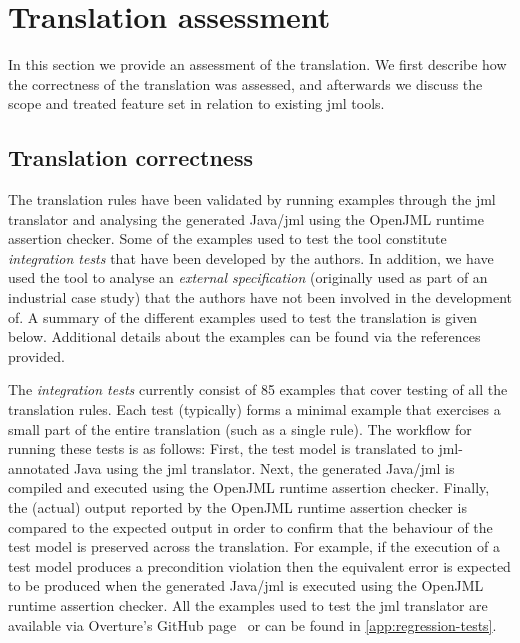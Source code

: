 
\section{Translation assessment}
\label{sec:assess}

In this section we provide an assessment of the translation. We first
describe how the correctness of the translation was assessed, and
afterwards we discuss the scope and treated feature set in relation to
existing \ac{jml} tools.

\subsection{Translation correctness}

The translation rules have been validated by running examples through
the \ac{jml} translator and analysing the generated Java/\ac{jml}
using the OpenJML runtime assertion checker. Some of the examples used
to test the tool constitute \emph{integration tests} that have been
developed by the authors. In addition, we have used the tool to
analyse an \emph{external specification} (originally used as part of
an industrial case study) that the authors have not been involved in
the development of. A summary of the different examples used to test
the translation is given below. Additional details about the examples
can be found via the references provided.

The \emph{integration tests} currently consist of 85 examples that
cover testing of all the translation rules. Each test (typically)
forms a minimal example that exercises a small part of the entire
translation (such as a single rule). The workflow for running these
tests is as follows: First, the test model is translated to
\ac{jml}-annotated Java using the \ac{jml} translator. Next, the
generated Java/\ac{jml} is compiled and executed using the OpenJML
runtime assertion checker. Finally, the (actual) output reported by
the OpenJML runtime assertion checker is compared to the expected
output in order to confirm that the behaviour of the test model is
preserved across the translation. For example, if the execution of a
test model produces a precondition violation then the equivalent error
is expected to be produced when the generated Java/\ac{jml} is
executed using the OpenJML runtime assertion checker. All the examples
used to test the \ac{jml} translator are available via Overture's
GitHub page~\cite{OvertureGithub} or can be found in
\cref{app:regression-tests}.

